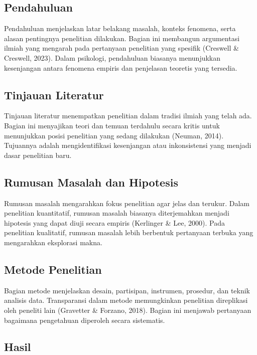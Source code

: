 \documentclass[
  indonesian,
  letterpaper,
  DIV=11,
  numbers=noendperiod]{scrreprt}
\begin{document}
\subsection{Pendahuluan}\label{pendahuluan-1}

Pendahuluan menjelaskan latar belakang masalah, konteks fenomena, serta
alasan pentingnya penelitian dilakukan. Bagian ini membangun argumentasi
ilmiah yang mengarah pada pertanyaan penelitian yang spesifik (Creswell
\& Creswell, 2023). Dalam psikologi, pendahuluan biasanya menunjukkan
kesenjangan antara fenomena empiris dan penjelasan teoretis yang
tersedia.

\subsection{Tinjauan Literatur}\label{tinjauan-literatur}

Tinjauan literatur menempatkan penelitian dalam tradisi ilmiah yang
telah ada. Bagian ini menyajikan teori dan temuan terdahulu secara
kritis untuk menunjukkan posisi penelitian yang sedang dilakukan
(Neuman, 2014). Tujuannya adalah mengidentifikasi kesenjangan atau
inkonsistensi yang menjadi dasar penelitian baru.

\subsection{Rumusan Masalah dan
Hipotesis}\label{rumusan-masalah-dan-hipotesis}

Rumusan masalah mengarahkan fokus penelitian agar jelas dan terukur.
Dalam penelitian kuantitatif, rumusan masalah biasanya diterjemahkan
menjadi hipotesis yang dapat diuji secara empiris (Kerlinger \& Lee,
2000). Pada penelitian kualitatif, rumusan masalah lebih berbentuk
pertanyaan terbuka yang mengarahkan eksplorasi makna.

\subsection{Metode Penelitian}\label{metode-penelitian}

Bagian metode menjelaskan desain, partisipan, instrumen, prosedur, dan
teknik analisis data. Transparansi dalam metode memungkinkan penelitian
direplikasi oleh peneliti lain (Gravetter \& Forzano, 2018). Bagian ini
menjawab pertanyaan bagaimana pengetahuan diperoleh secara sistematis.

\subsection{Hasil}\label{hasil}
\end{document}
